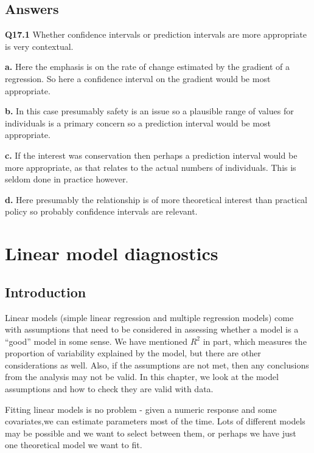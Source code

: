 \documentclass[
  oneside]{krantz}
\begin{document}
\hypertarget{ANSpred}{%
\section{Answers}\label{ANSpred}}

\textbf{Q17.1} Whether confidence intervals or prediction intervals are more appropriate is very contextual.

\textbf{a.} Here the emphasis is on the rate of change estimated by the gradient of a regression. So here a confidence interval on the gradient would be most appropriate.

\textbf{b.} In this case presumably safety is an issue so a plausible range of values for individuals is a primary concern so a prediction interval would be most appropriate.

\textbf{c.} If the interest was conservation then perhaps a prediction interval would be more appropriate, as that relates to the actual numbers of individuals. This is seldom done in practice however.

\textbf{d.} Here presumably the relationship is of more theoretical interest than practical policy so probably confidence intervals are relevant.

\hypertarget{diagnostics}{%
\chapter{Linear model diagnostics}\label{diagnostics}}

\hypertarget{INTdiag}{%
\section{Introduction}\label{INTdiag}}

Linear models (simple linear regression and multiple regression models) come with assumptions that need to be considered in assessing whether a model is a ``good'' model in some sense. We have mentioned \(R^2\) in part, which measures the proportion of variability explained by the model, but there are other considerations as well. Also, if the assumptions are not met, then any conclusions from the analysis may not be valid. In this chapter, we look at the model assumptions and how to check they are valid with data.

Fitting linear models is no problem - given a numeric response and some covariates,we can estimate parameters most of the time. Lots of different models may be possible and we want to select between them, or perhaps we have just one theoretical model we want to fit.
\end{document}
